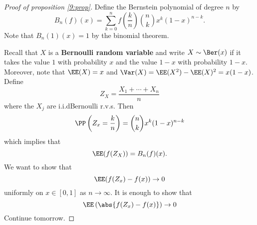 \begin{proof}[Proof of proposition \ref{9:prop}]
	Define the Bernstein polynomial of degree $n$ by
	\[B_n(f)(x) = \sum_{k=0}^n f\left(\frac kn\right) \binom{n}{k} x^k (1-x)^{n-k}.\]
	Note that $B_n(1)(x) = 1$ by the binomial theorem.
	
	Recall that $X$ is a \textbf{Bernoulli random variable} and write $X \sim \Ber(x)$ if it takes the value $1$ with probability $x$ and the value $1-x$ with probability $1-x$.
	Moreover, note that $\EE(X)=x$ and $\Var(X)=\EE(X^2)-\EE(X)^2=x(1-x)$.
	Define
	\[Z_X = \frac{X_1+\cdots+X_n}n\]
	where the $X_j$ are i.i.d\@ Bernoulli r.v.s.
	Then
	\[\PP\left(Z_x = \frac kn\right) = \binom{n}{k} x^k(1-x)^{n-k}\]
	which implies that
	\[\EE(f(Z_X)) = B_n(f)(x).\]
	We want to show that
	\[\EE(f(Z_x)-f(x)) \to 0\]
	uniformly on $x \in [0,1]$ as $n \to \infty$.
	It is enough to show that
	\[\EE\left(\abs{f(Z_x)-f(x)}\right) \to 0\]
	Continue tomorrow.
\end{proof}